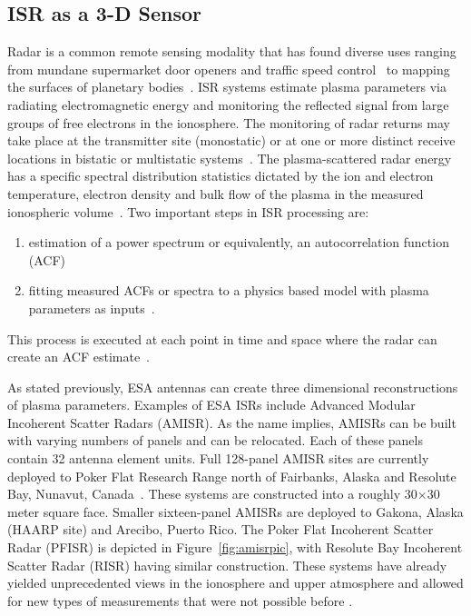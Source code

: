 \subsection{ISR as a 3-D Sensor}
Radar is a common remote sensing modality that has found diverse uses ranging from mundane supermarket door openers and traffic speed control~\citep{richards2010principles} to mapping the surfaces of planetary bodies~\citep{campbell2002radar}. ISR systems estimate plasma parameters via radiating electromagnetic energy and monitoring the reflected signal from large groups of free electrons in the ionosphere. The monitoring of radar returns may take place at the transmitter site (monostatic) or at one or more distinct receive locations in bistatic or multistatic systems~\citep{RDS:RDS2903}. The plasma-scattered radar energy has a specific spectral distribution statistics dictated by the ion and electron temperature, electron density and bulk flow of the plasma in the measured ionospheric volume~\citep{dougherty:farley1960,farleydougherty:ISR2,doughteryfarley:ISR3,hagfors1961}. Two important steps in ISR processing are:
\begin{enumerate}
\item estimation of a power spectrum or equivalently, an autocorrelation function (ACF)~\citep{farley1969}
\item fitting measured ACFs or spectra to a physics based model with plasma parameters as inputs~\citep{RDS:RDS1387}.
\end{enumerate}
This process is executed at each point in time and space where the radar can create an ACF estimate~\citep{nikoukar2008}. 

As stated previously, ESA antennas can create three dimensional reconstructions of plasma parameters. Examples of ESA ISRs include Advanced Modular Incoherent Scatter Radars (AMISR).
As the name implies, AMISRs can be built with varying numbers of panels and can be relocated. Each of these panels contain 32 antenna element units.
Full 128-panel AMISR sites are currently deployed to Poker Flat Research Range north of Fairbanks, Alaska and Resolute Bay, Nunavut, Canada~\citep{Semeter2009738,Valentic:2013jg,Nicolls2015a}. These systems are constructed into a roughly 30$\times$30 meter square face.
Smaller sixteen-panel AMISRs are deployed to Gakona, Alaska (HAARP site) and Arecibo, Puerto Rico.
The Poker Flat Incoherent Scatter Radar (PFISR) is depicted in Figure~\ref{fig:amisrpic}, with Resolute Bay Incoherent Scatter Radar (RISR) having similar construction. 
These systems have already yielded unprecedented views in the ionosphere and upper atmosphere and allowed for new types of measurements that were not possible before \citep{semeter2010CI,butler:imagingfregiondrifts,Nicolls:2007ie}. %

